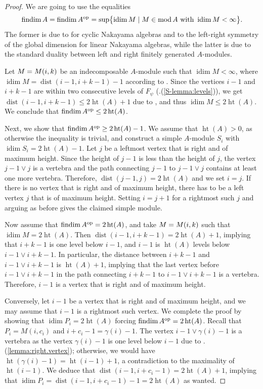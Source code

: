 \documentclass[a4paper]{amsart}
\theoremstyle{definition}
\theoremstyle{remark}
\numberwithin{equation}{theorem}
\renewcommand{\mod}{\operatorname{mod}}
\newcommand{\findim}{\operatorname{findim}}
\newcommand{\height}{\operatorname{ht}}
\newcommand{\idim}{\operatorname{idim}}
\newcommand{\dist}{\operatorname{dist}}
\newcommand{\psiforest}{F_\psi}
\newcommand{\op}{\textnormal{op}}
\begin{document}
\begin{proof}
    We are going to use the equalities
        \[
            \findim A = \findim A^\op = \sup \bigl\{ \idim M \mid M\in\mod A \text{ with }\idim M<\infty \bigr\}    .
        \]
    The former is due to \cite[Theorem~A.(vii)]{Se2} for cyclic Nakayama algebras and to the left-right symmetry of the global dimension for linear Nakayama algebras, while the latter is due to the standard duality between left and right finitely generated $ A $-modules.
    
    Let $M = \mik$ be an indecomposable $ A $-module such that $ \idim M < \infty $, where $ \idim M = \dist(i-1, i+k-1) - 1 $ according to . Since the vertices $ i-1 $ and $ i+k-1 $ are within two consecutive levels of $ \psiforest $ (.(\ref{S-lemma:levels})), we get $ \dist(i-1, i+k-1) \leq 2 \height(A) + 1 $ due to , and thus $ \idim M \leq 2 \height(A) $. We conclude that  $ \findim A^{\op} \leq 2 \height ( A ) $.

    Next, we show that $ \findim A^{\op} \geq 2 \height ( A ) - 1 $. We assume that $ \height ( A ) > 0 $, as otherwise the inequality is trivial, and construct a simple $ A $-module $ S_i $ with $ \idim S_i = 2 \height ( A ) - 1 $. Let $ j $ be a leftmost vertex that is right and of maximum height. Since the height of $ j-1 $ is less than the height of $ j $, the vertex $ j-1 \vee j $ is a vertebra and the path connecting $ j-1 $ to $ j-1 \vee j $ contains at least one more vertebra. Therefore, $ \dist (  j-1, j ) = 2 \height ( A ) $ and we set $ i = j $. If there is no vertex that is right and of maximum height, there has to be a left vertex $ j $ that is of maximum height. Setting $ i=j+1 $ for a rightmost such $ j $ and arguing as before gives the claimed simple module.

    Now assume that $ \findim A^{\op} = 2 \height (A) $, and take $ M = \mik $ such that $ \idim M = 2 \height (A) $. Then $ \dist(i-1, i+k-1) = 2 \height(A) + 1 $, implying that $ i+k-1 $ is one level below $ i-1 $, and $ i-1 $ is $ \height(A) $ levels below $ i-1 \vee i+k-1 $. In particular, the distance between $ i+k-1 $ and $ i-1 \vee i+k-1 $ is $ \height(A)+1 $, implying that the last vertex before $ i-1 \vee i+k-1 $ in the path connecting $i+k-1 $ to $ i-1 \vee i+k-1 $ is a vertebra. Therefore, $ i-1 $ is a vertex that is right and of maximum height.

    Conversely, let $ i-1 $ be a vertex that is right and of maximum height, and we may assume that $ i-1 $ is a rightmost such vertex. We complete the proof by showing that $ \idim P_i = 2 \height(A) $ forcing $ \findim A^{\op} = 2 \height(A) $. Recall that $ P_i = M (i,c_i) $ and $ i+c_i-1 = \gamma(i)-1 $. The vertex $ i-1 \vee \gamma(i)-1 $ is a vertebra as the vertex $ \gamma(i)-1 $ is one level below $ i-1 $ due to .(\ref{lemma:right.vertex}); otherwise, we would have $ \height ( \gamma(i)-1 ) = \height ( i-1 ) + 1 $, a contradiction to the maximality of $ \height ( i-1 ) $. We deduce that $ \dist( i-1, i+c_i-1 ) = 2 \height(A) + 1 $, implying that $ \idim P_i =  \dist( i-1, i+c_i-1  ) - 1 = 2 \height(A) $ as wanted.
\end{proof}
\end{document}
